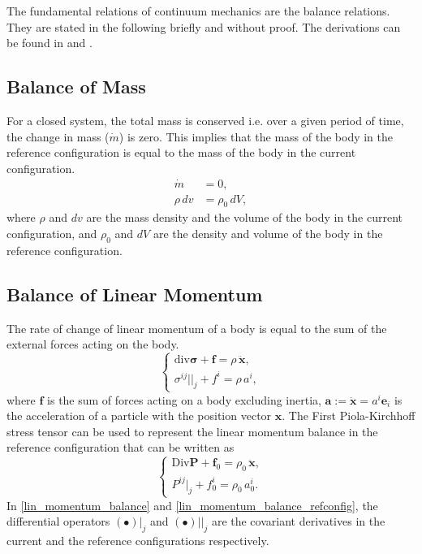 The fundamental relations of continuum mechanics are the balance relations.
 They are stated in the following briefly and without proof. The derivations can be found in \cite{wriggers2008} and \cite{itskov2020}.
\subsection{Balance of Mass}
For a closed system, the total mass is conserved i.e. over a given period of time, the change in mass ($\dot{m}$) is zero.
 This implies that the mass of the body in the reference configuration is equal to the 
 mass of the body in the current configuration.
\begin{align}\label{mass_balance}
    \dot{m} &= 0,\\
    \rho \, dv &= \rho_{0} \, dV,
\end{align}
where $\rho$ and $dv$ are the mass density and the volume of the body in the current configuration, and 
 $\rho_{0}$ and $dV$ are the density and volume of the body in the reference configuration.
\subsection{Balance of Linear Momentum}
The rate of change of linear momentum of a body is equal to the sum of the external forces acting on the body.
\begin{equation}\label{lin_momentum_balance}
    \begin{cases}
        \mathrm{div} \boldsymbol{\sigma} + \boldsymbol{f} = \rho \, \boldsymbol{\ddot{x}},\\
        \sigma ^{ij}||_{j} + f^{i} = \rho \, a^{i},
    \end{cases}  
\end{equation}
where $\boldsymbol{f}$ is the sum of forces acting on a body excluding inertia, $\boldsymbol{a} := \boldsymbol{\ddot{x}} = a^{i} \boldsymbol{e}_{i}$
 is the acceleration of a particle with the position vector $\boldsymbol{x}$.
The First Piola-Kirchhoff stress tensor can be used to represent the linear momentum balance in the reference configuration that can be written as
\begin{equation}\label{lin_momentum_balance_refconfig}
    \begin{cases}
        \mathrm{Div} \boldsymbol{{P}} + \boldsymbol{f}_{0} = \rho_{0} \, \boldsymbol{\ddot{x}},\\
        P^{ij}|_{j} + f_{0}^{i} = \rho_{0} \, a_{0}^{i}.\
    \end{cases}
\end{equation} 
In \eqref{lin_momentum_balance} and \eqref{lin_momentum_balance_refconfig}, the differential operators $(\bullet)|_{j}$
 and $(\bullet)||_{j}$ are the covariant derivatives in the current and the reference configurations respectively.
